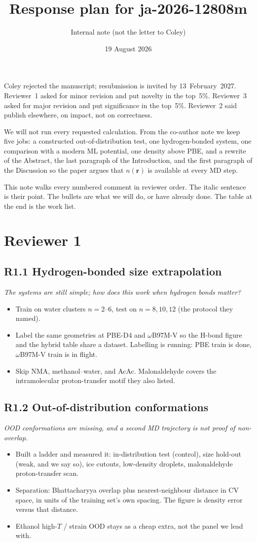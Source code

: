 \documentclass[11pt]{article}
\title{Response plan for ja-2026-12808m}
\author{Internal note (not the letter to Coley)}
\date{19 August 2026}
\newcommand{\revpoint}[1]{\textit{#1}\par\nopagebreak\vspace{0.35em}}
\newcommand{\revhead}[1]{\subsection*{#1}}
\begin{document}
\maketitle

\noindent
Coley rejected the manuscript; resubmission is invited by 13~February~2027.
Reviewer~1 asked for minor revision and put novelty in the top~5\%.
Reviewer~3 asked for major revision and put significance in the top~5\%.
Reviewer~2 said publish elsewhere, on impact, not on correctness.

We will not run every requested calculation.
From the co-author note we keep five jobs: a constructed out-of-distribution test,
one hydrogen-bonded system, one comparison with a modern ML potential,
one density above PBE, and a rewrite of the Abstract, the last paragraph of the
Introduction, and the first paragraph of the Discussion so the paper argues that
$n(\mathbf{r})$ is available at every MD step.

This note walks every numbered comment in reviewer order.
The italic sentence is their point.
The bullets are what we will do, or have already done.
The table at the end is the work list.

\section{Reviewer 1}

\revhead{R1.1 Hydrogen-bonded size extrapolation}
\revpoint{The systems are still simple; how does this work when hydrogen bonds matter?}
\begin{itemize}
  \item Train on water clusters $n=2$--$6$, test on $n=8,10,12$ (the protocol they named).
  \item Label the same geometries at PBE-D4 and $\omega$B97M-V so the H-bond figure
        and the hybrid table share a dataset. Labelling is running: PBE train is done,
        $\omega$B97M-V train is in flight.
  \item Skip NMA, methanol--water, and AcAc. Malonaldehyde covers the intramolecular
        proton-transfer motif they also listed.
\end{itemize}

\revhead{R1.2 Out-of-distribution conformations}
\revpoint{OOD conformations are missing, and a second MD trajectory is not proof of non-overlap.}
\begin{itemize}
  \item Built a ladder and measured it: in-distribution test (control), size hold-out
        (weak, and we say so), ice cutouts, low-density droplets, malonaldehyde
        proton-transfer scan.
  \item Separation: Bhattacharyya overlap plus nearest-neighbour distance in CV space,
        in units of the training set's own spacing. The figure is density error versus
        that distance.
  \item Ethanol high-$T$ / strain OOD stays as a cheap extra, not the panel we lead with.
\end{itemize}
\end{document}
